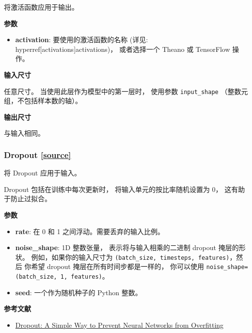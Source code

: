 将激活函数应用于输出。

\textbf{参数}

\begin{itemize}
\tightlist
\item
  \textbf{activation}: 要使用的激活函数的名称 (详见:
  hyperref[activations]{activations})， 或者选择一个 Theano 或
  TensorFlow 操作。
\end{itemize}

\textbf{输入尺寸}

任意尺寸。 当使用此层作为模型中的第一层时， 使用参数
\texttt{input\_shape} （整数元组，不包括样本数的轴）。

\textbf{输出尺寸}

与输入相同。



\subsubsection{Dropout {\href{https://github.com/keras-team/keras/blob/master/keras/layers/core.py\#L78}{{[}source{]}}}}

\begin{Shaded}
\begin{Highlighting}[]
\OperatorTok{=}\OperatorTok{=}\NormalTok{)}
\end{Highlighting}
\end{Shaded}

将 Dropout 应用于输入。

Dropout 包括在训练中每次更新时， 将输入单元的按比率随机设置为 0，
这有助于防止过拟合。

\textbf{参数}

\begin{itemize}
\tightlist
\item
  \textbf{rate}: 在 0 和 1 之间浮动。需要丢弃的输入比例。
\item
  \textbf{noise\_shape}: 1D 整数张量， 表示将与输入相乘的二进制 dropout
  掩层的形状。 例如，如果你的输入尺寸为
  \texttt{(batch\_size,\ timesteps,\ features)}，然后 你希望 dropout
  掩层在所有时间步都是一样的， 你可以使用
  \texttt{noise\_shape=(batch\_size,\ 1,\ features)}。
\item
  \textbf{seed}: 一个作为随机种子的 Python 整数。
\end{itemize}

\textbf{参考文献}

\begin{itemize}
\tightlist
\item
  \href{http://www.cs.toronto.edu/~rsalakhu/papers/srivastava14a.pdf}{Dropout:
  A Simple Way to Prevent Neural Networks from Overfitting}
\end{itemize}




